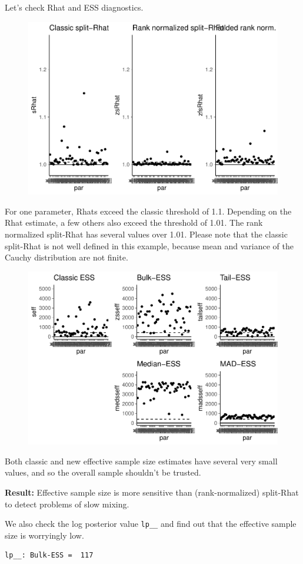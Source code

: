 \documentclass[american,]{article}
\begin{document}
Let's check Rhat and ESS diagnostics.

\begin{figure}[tp]
  \centering
  \includegraphics[width=0.6\linewidth]{graphics/rhat-fit-nom-1.pdf}
\end{figure}

For one parameter, Rhats exceed the classic threshold of 1.1. Depending
on the Rhat estimate, a few others also exceed the threshold of 1.01.
The rank normalized split-Rhat has several values over 1.01. Please note
that the classic split-Rhat is not well defined in this example, because
mean and variance of the Cauchy distribution are not finite.

\begin{figure}[tp]
  \centering
  \includegraphics[width=0.6\linewidth]{graphics/ess-fit-nom-1.pdf}
\end{figure}

Both classic and new effective sample size estimates have several very
small values, and so the overall sample shouldn't be trusted.

\textbf{Result:} Effective sample size is more sensitive than
(rank-normalized) split-Rhat to detect problems of slow mixing.

We also check the log posterior value \texttt{lp\_\_} and find out that
the effective sample size is worryingly low.

\begin{verbatim}
lp__: Bulk-ESS =  117
\end{verbatim}
\end{document}
